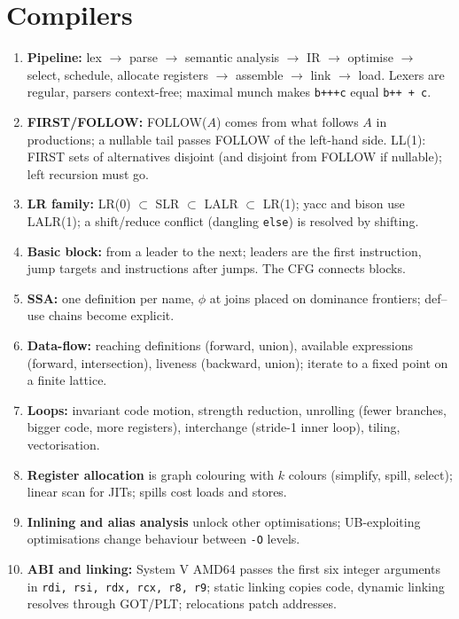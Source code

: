 \documentclass[10pt,a4paper,openany,oneside]{report}
\begin{document}
\section*{Compilers}
\begin{enumerate}[nosep,leftmargin=2.2em,start=10,label=\textbf{\arabic*.}]
\item \textbf{Pipeline:} lex $\to$ parse $\to$ semantic analysis $\to$ IR $\to$ optimise $\to$ select, schedule, allocate registers $\to$ assemble $\to$ link $\to$ load. Lexers are regular, parsers context-free; maximal munch makes \texttt{b+++c} equal \texttt{b++ + c}.
\item \textbf{FIRST/FOLLOW:} FOLLOW($A$) comes from what follows $A$ in productions; a nullable tail passes FOLLOW of the left-hand side. LL(1): FIRST sets of alternatives disjoint (and disjoint from FOLLOW if nullable); left recursion must go.
\item \textbf{LR family:} LR(0) $\subset$ SLR $\subset$ LALR $\subset$ LR(1); yacc and bison use LALR(1); a shift/reduce conflict (dangling \texttt{else}) is resolved by shifting.
\item \textbf{Basic block:} from a leader to the next; leaders are the first instruction, jump targets and instructions after jumps. The CFG connects blocks.
\item \textbf{SSA:} one definition per name, $\phi$ at joins placed on dominance frontiers; def--use chains become explicit.
\item \textbf{Data-flow:} reaching definitions (forward, union), available expressions (forward, intersection), liveness (backward, union); iterate to a fixed point on a finite lattice.
\item \textbf{Loops:} invariant code motion, strength reduction, unrolling (fewer branches, bigger code, more registers), interchange (stride-1 inner loop), tiling, vectorisation.
\item \textbf{Register allocation} is graph colouring with $k$ colours (simplify, spill, select); linear scan for JITs; spills cost loads and stores.
\item \textbf{Inlining and alias analysis} unlock other optimisations; UB-exploiting optimisations change behaviour between \texttt{-O} levels.
\item \textbf{ABI and linking:} System V AMD64 passes the first six integer arguments in \texttt{rdi, rsi, rdx, rcx, r8, r9}; static linking copies code, dynamic linking resolves through GOT/PLT; relocations patch addresses.
\end{enumerate}
\end{document}
